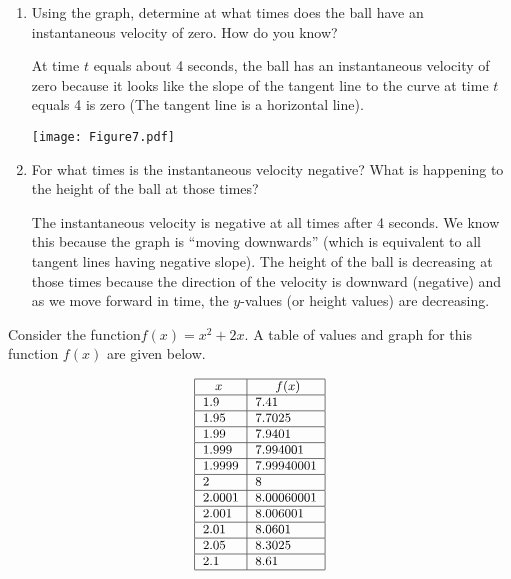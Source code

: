 \documentclass[nooutcomes]{ximera}
\begin{document}
\begin{problem}
\begin{problem}
\begin{enumerate}
		
			
		\item  Using the graph, determine at what times does the ball have an instantaneous velocity of zero.  How do you know?
		\begin{freeResponse}		 
		At time $t$ equals about 4 seconds, the ball has an instantaneous velocity of zero because it looks like the slope of the tangent line to the curve at time $t$ equals 4 is zero (The tangent line is a horizontal line).
			\begin{image}
			\texttt{[image: Figure7.pdf]}
			\end{image}
		\end{freeResponse}
		
		
		
		\item  For what times is the instantaneous velocity negative?  What is happening to the height of the ball at those times?
			
		\begin{freeResponse}		 
		The instantaneous velocity is negative at all times after 4 seconds.  We know this because the graph is ``moving downwards'' (which is equivalent to all tangent lines having negative slope).  The height of the ball is decreasing at those times because the direction of the velocity is downward (negative) and as we move forward in time, the $y$-values (or height values) are decreasing. 
		\end{freeResponse}
			
		\end{enumerate}
			
\end{problem}
			
			
			
			
			
\begin{problem}
Consider the function$f(x)=x^2+2x$.  A table of values and graph for this function $f(x)$ are given below.

\[ \begin{array}{lr}

\small{			
\begin{tabular}{|l|l|}
\hline
\hspace{2mm} $x$ & \hspace{4mm} $f(x)$  \\
\hline
1.9 & 7.41  \\
\hline
1.95 & 7.7025  \\
\hline
1.99 & 7.9401  \\
\hline
1.999 & 7.994001  \\
\hline
1.9999 & 7.99940001  \\
\hline
2 & 8  \\
\hline
2.0001 & 8.00060001  \\
\hline
2.001 & 8.006001  \\
\hline
2.01 & 8.0601  \\
\hline
2.05 & 8.3025  \\
\hline
2.1 & 8.61 \\
\hline
\end{tabular}
}


\end{array}\]
\end{problem}
\end{problem}
\end{document}
